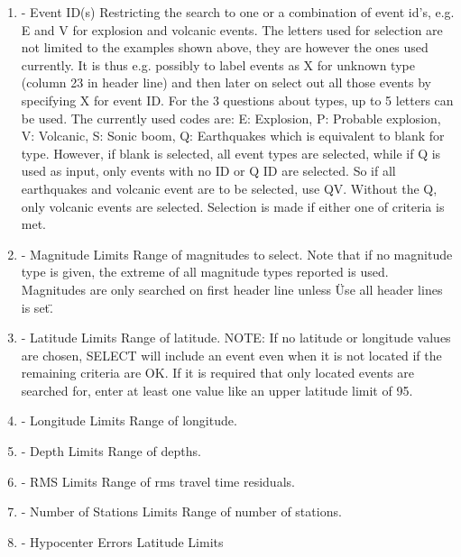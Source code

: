 \begin{enumerate}
\item 
- Event ID(s)                              \newline
Restricting the search to one or a combination of event id's, e.g. E and V for explosion and volcanic events. The letters used for selection are not limited to the examples shown above, they are however the ones used currently. It is thus e.g. possibly to label events as X for unknown type (column 23 in header line) and then later on select out all those events by specifying X for event ID. For the 3 questions about types, up to 5 letters can be used. The currently used codes are:  E: Explosion, P: Probable explosion, V: Volcanic, S: Sonic boom, Q: Earthquakes which is equivalent to blank for type. However, if blank is selected, all event types are selected, while if Q is used as input, only events with no ID or Q ID are selected. So if all earthquakes and volcanic event are to be selected, use QV. Without the Q, only volcanic events are selected. Selection is made if either one of criteria is met. 
\item 
- Magnitude Limits \newline
Range of magnitudes to select.  Note that if no magnitude type is given, the extreme of all magnitude types reported is used. Magnitudes are only searched on first header line unless \"Use all header lines is set\". 
\item 
- Latitude Limits \newline
Range of latitude. NOTE: If no latitude or longitude values are chosen, SELECT will include an event even when it is not located if the remaining criteria are OK. If it is required that only located events are searched for, enter at least one value like an upper latitude limit of 95. 
\item 
- Longitude Limits\newline
Range of longitude. 
\item 
- Depth Limits\newline
Range of depths. 
\item 
- RMS Limits\newline
Range of rms travel time residuals. 
\item 
{}
- Number of Stations Limits \newline
Range of number of stations. 
\item 
- Hypocenter Errors Latitude Limits \newline

\end{enumerate}
